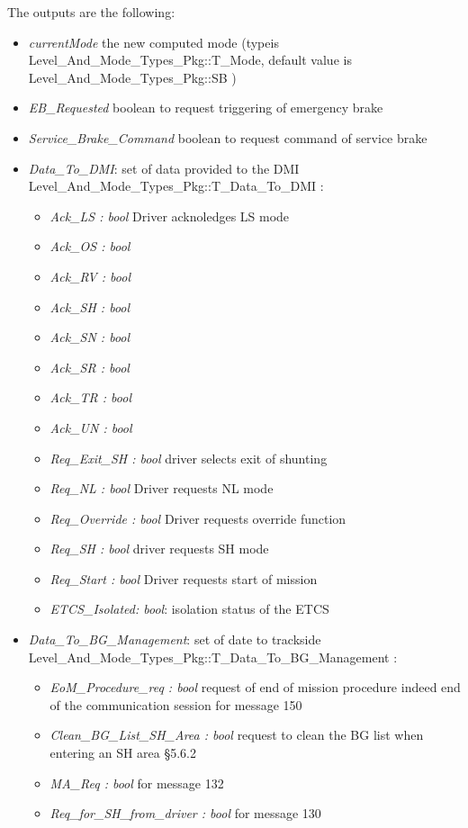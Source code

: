 The outputs are the following:

\begin{itemize}
\item \emph{currentMode} the new computed mode (typeis  Level\_And\_Mode\_Types\_Pkg::T\_Mode, default value is Level\_And\_Mode\_Types\_Pkg::SB )
\item \emph{EB\_Requested} boolean to request triggering of emergency brake 	  	
\item \emph{Service\_Brake\_Command} boolean to request command of service brake 	  	
\item \emph{Data\_To\_DMI}: set of data provided to the DMI	Level\_And\_Mode\_Types\_Pkg::T\_Data\_To\_DMI 	:  	
\begin{itemize}
\item \emph{Ack\_LS : bool} Driver acknoledges LS mode
\item \emph{Ack\_OS : bool}
\item \emph{Ack\_RV : bool}
\item \emph{Ack\_SH : bool}
\item \emph{Ack\_SN : bool}
\item \emph{Ack\_SR : bool}
\item \emph{Ack\_TR : bool}
\item \emph{Ack\_UN : bool}
\item \emph{Req\_Exit\_SH : bool} driver selects exit of shunting
\item \emph{Req\_NL : bool} Driver requests NL mode
\item \emph{Req\_Override : bool} Driver requests override function
\item \emph{Req\_SH : bool} driver requests SH mode
\item \emph{Req\_Start : bool} Driver requests start of mission
\item \emph{ETCS\_Isolated: bool}: isolation status of the ETCS
\end{itemize}
\item \emph{Data\_To\_BG\_Management}: set of date to trackside Level\_And\_Mode\_Types\_Pkg::T\_Data\_To\_BG\_Management 	: 
\begin{itemize}
\item \emph{EoM\_Procedure\_req : bool} request of end of mission procedure indeed end of the communication session for message 150
\item \emph{Clean\_BG\_List\_SH\_Area : bool} request to clean the BG  list when entering  an SH area §5.6.2
\item \emph{MA\_Req : bool} for message 132
\item \emph{Req\_for\_SH\_from\_driver : bool} for message 130
\end{itemize}
\end{itemize}


